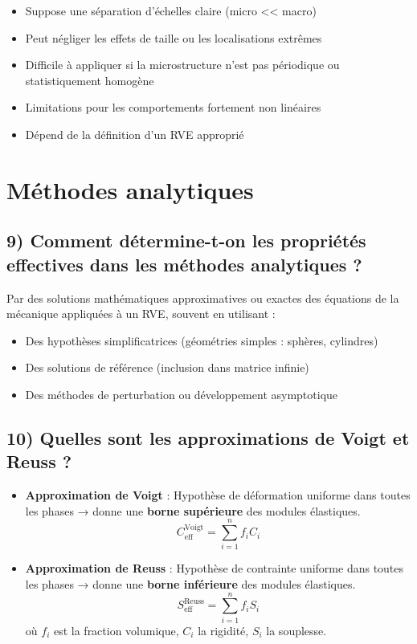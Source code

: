 \documentclass{rapportECL}
\begin{document}
\begin{tcolorbox}[colback=white!5!white,colframe=blue!75!black]
\begin{itemize}[noitemsep]
\item Suppose une séparation d'échelles claire (micro << macro)
\item Peut négliger les effets de taille ou les localisations extrêmes
\item Difficile à appliquer si la microstructure n'est pas périodique ou statistiquement homogène
\item Limitations pour les comportements fortement non linéaires
\item Dépend de la définition d'un RVE approprié
\end{itemize}
\end{tcolorbox}

\section{Méthodes analytiques}

\subsection*{9) Comment détermine-t-on les propriétés effectives dans les méthodes analytiques ?}

\begin{tcolorbox}[colback=white!5!white,colframe=blue!75!black]
Par des solutions mathématiques approximatives ou exactes des équations de la mécanique appliquées à un RVE, souvent en utilisant :
\begin{itemize}[noitemsep]
\item Des hypothèses simplificatrices (géométries simples : sphères, cylindres)
\item Des solutions de référence (inclusion dans matrice infinie)
\item Des méthodes de perturbation ou développement asymptotique
\end{itemize}
\end{tcolorbox}

\subsection*{10) Quelles sont les approximations de Voigt et Reuss ?}

\begin{tcolorbox}[colback=white!5!white,colframe=blue!75!black]
\begin{itemize}[noitemsep]
\item \textbf{Approximation de Voigt} : Hypothèse de déformation uniforme dans toutes les phases → donne une \textbf{borne supérieure} des modules élastiques.
\[
C_{\text{eff}}^{\text{Voigt}} = \sum_{i=1}^{n} f_i C_i
\]
\item \textbf{Approximation de Reuss} : Hypothèse de contrainte uniforme dans toutes les phases → donne une \textbf{borne inférieure} des modules élastiques.
\[
S_{\text{eff}}^{\text{Reuss}} = \sum_{i=1}^{n} f_i S_i
\]
où $f_i$ est la fraction volumique, $C_i$ la rigidité, $S_i$ la souplesse.
\end{itemize}
\end{tcolorbox}
\end{document}
